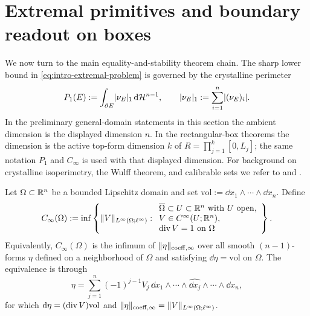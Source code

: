 \section{Extremal primitives and boundary readout on boxes}

We now turn to the main equality-and-stability theorem chain. The sharp lower
bound in \eqref{eq:intro-extremal-problem} is governed by the crystalline
perimeter
\[
P_1(E):=\int_{\partial E}\lvert \nu_E \rvert_1\,\mathrm{d}\mathcal{H}^{n-1},
\qquad
\lvert \nu_E \rvert_1:=\sum_{i=1}^n \lvert (\nu_E)_i \rvert.
\]
In the preliminary general-domain statements in this section the ambient
dimension is the displayed dimension $n$. In the rectangular-box theorems the
dimension is the active top-form dimension $k$ of
$R=\prod_{j=1}^k[0,L_j]$; the same notation $P_1$ and $C_\infty$ is used with
that displayed dimension.
For background on crystalline isoperimetry, the Wulff theorem, and calibrable
sets we refer to
\cite{Taylor1978,Fonseca1991,FonsecaMuller1991,DacorognaPfister1992,
FigalliZhang2022,DeMason2024} and
\cite{Strang1983,Nozawa1990,Grieser2006,Strang2010,
CasellesFaccioloMeinhardt2009,CasellesChambolleMollNovaga2008,
Leonardi2015,Parini2011}.

\begin{definition}
\label{def:C-infty}
Let $\Omega\subset\mathbb{R}^n$ be a bounded Lipschitz domain and set
$\mathrm{vol}:=\dd x_1\wedge\cdots\wedge\dd x_n$. Define
\[
C_\infty(\Omega):=
\inf\left\{
\lVert V \rVert_{L^\infty(\Omega;\ell^\infty)}:
\begin{array}{l}
\overline\Omega\subset U\subset\mathbb{R}^n\ \text{with }U\text{ open},\\
V\in C^\infty(U;\mathbb{R}^n),\\
\operatorname{div} V=1\ \text{on }\Omega
\end{array}
\right\}.
\]
Equivalently, $C_\infty(\Omega)$ is the infimum of
$\lVert \eta \rVert_{\mathrm{coeff},\infty}$ over all smooth $(n-1)$-forms $\eta$ defined on a
neighborhood of $\Omega$ and satisfying $\dd\eta=\mathrm{vol}$ on $\Omega$.
The equivalence is through
\begin{equation}
\label{eq:form-vector-identification}
\eta=
\sum_{j=1}^n(-1)^{j-1}V_j\,
\dd x_1\wedge\cdots\wedge\widehat{\dd x_j}\wedge\cdots\wedge\dd x_n,
\end{equation}
for which $\mathrm{d}\eta=(\operatorname{div} V)\mathrm{vol}$ and
$\lVert \eta \rVert_{\mathrm{coeff},\infty}=\lVert V \rVert_{L^\infty(\Omega;\ell^\infty)}$.
\end{definition}


